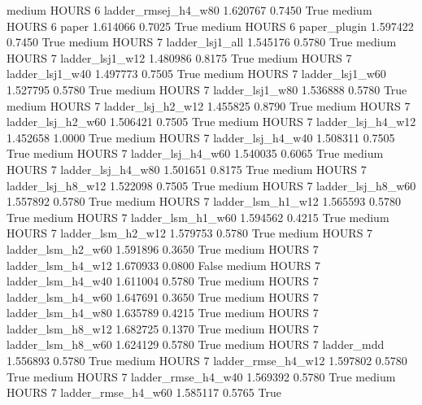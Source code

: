     medium    HOURS                 6 ladder_rmsej_h4_w80   1.620767      0.7450    True
    medium    HOURS                 6               paper   1.614066      0.7025    True
    medium    HOURS                 6        paper_plugin   1.597422      0.7450    True
    medium    HOURS                 7     ladder_lsj1_all   1.545176      0.5780    True
    medium    HOURS                 7     ladder_lsj1_w12   1.480986      0.8175    True
    medium    HOURS                 7     ladder_lsj1_w40   1.497773      0.7505    True
    medium    HOURS                 7     ladder_lsj1_w60   1.527795      0.5780    True
    medium    HOURS                 7     ladder_lsj1_w80   1.536888      0.5780    True
    medium    HOURS                 7   ladder_lsj_h2_w12   1.455825      0.8790    True
    medium    HOURS                 7   ladder_lsj_h2_w60   1.506421      0.7505    True
    medium    HOURS                 7   ladder_lsj_h4_w12   1.452658      1.0000    True
    medium    HOURS                 7   ladder_lsj_h4_w40   1.508311      0.7505    True
    medium    HOURS                 7   ladder_lsj_h4_w60   1.540035      0.6065    True
    medium    HOURS                 7   ladder_lsj_h4_w80   1.501651      0.8175    True
    medium    HOURS                 7   ladder_lsj_h8_w12   1.522098      0.7505    True
    medium    HOURS                 7   ladder_lsj_h8_w60   1.557892      0.5780    True
    medium    HOURS                 7   ladder_lsm_h1_w12   1.565593      0.5780    True
    medium    HOURS                 7   ladder_lsm_h1_w60   1.594562      0.4215    True
    medium    HOURS                 7   ladder_lsm_h2_w12   1.579753      0.5780    True
    medium    HOURS                 7   ladder_lsm_h2_w60   1.591896      0.3650    True
    medium    HOURS                 7   ladder_lsm_h4_w12   1.670933      0.0800   False
    medium    HOURS                 7   ladder_lsm_h4_w40   1.611004      0.5780    True
    medium    HOURS                 7   ladder_lsm_h4_w60   1.647691      0.3650    True
    medium    HOURS                 7   ladder_lsm_h4_w80   1.635789      0.4215    True
    medium    HOURS                 7   ladder_lsm_h8_w12   1.682725      0.1370    True
    medium    HOURS                 7   ladder_lsm_h8_w60   1.624129      0.5780    True
    medium    HOURS                 7          ladder_mdd   1.556893      0.5780    True
    medium    HOURS                 7  ladder_rmse_h4_w12   1.597802      0.5780    True
    medium    HOURS                 7  ladder_rmse_h4_w40   1.569392      0.5780    True
    medium    HOURS                 7  ladder_rmse_h4_w60   1.585117      0.5765    True
